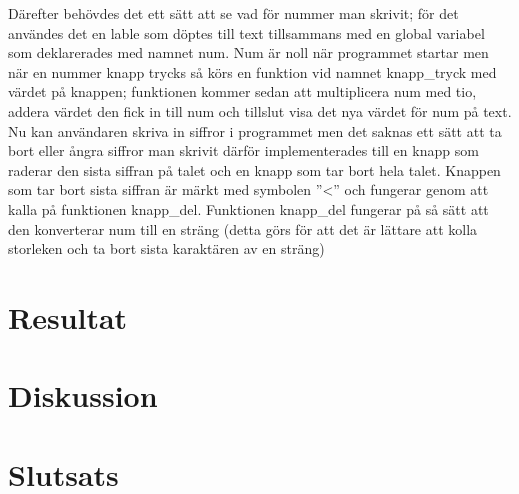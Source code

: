 \documentclass[a4paper, 12pt]{article}
\begin{document}
Därefter behövdes det ett sätt att se vad för nummer man skrivit; för det användes det en lable som döptes till text tillsammans med en global variabel som deklarerades med namnet num.
Num är noll när programmet startar men när en nummer knapp trycks så körs en funktion vid namnet knapp\_tryck med värdet på knappen; funktionen kommer sedan att multiplicera num med tio, addera värdet den fick in till num och tillslut visa det nya värdet för num på text. 
Nu kan användaren skriva in siffror i programmet men det saknas ett sätt att ta bort eller ångra siffror man skrivit därför implementerades till en knapp som raderar den sista siffran på talet och en knapp som tar bort hela talet.
Knappen som tar bort sista siffran är märkt med symbolen ''<'' och fungerar genom att kalla på funktionen knapp\_del. Funktionen knapp\_del fungerar på så sätt att den konverterar num till en sträng (detta görs för att det är lättare att kolla storleken och ta bort sista karaktären av en sträng)


\section{Resultat}

\section{Diskussion}

\section{Slutsats}

\newpage 

%

\printbibliography
\end{document}
